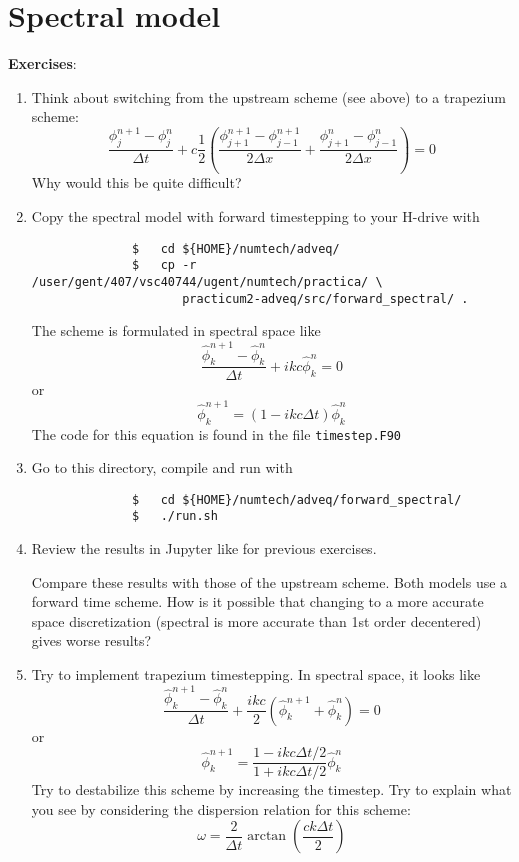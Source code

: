 \documentclass[a4paper]{article}
\begin{document}
\section{Spectral model}
%
\textbf{Exercises}:
%
\begin{enumerate}
	\item Think about switching from the upstream scheme (see above) to a trapezium scheme:
		\begin{equation*}
			\frac{\phi^{n+1}_{j}-\phi^{n}_{j}}{\Delta t}+c\frac{1}{2}\left(\frac{\phi^{n+1}_{j+1}-\phi^{n+1}_{j-1}}{2\Delta x}+\frac{\phi^{n}_{j+1}-\phi^{n}_{j-1}}{2\Delta x}\right)=0
		\end{equation*}
		Why would this be quite difficult?
	\item Copy the spectral model with forward timestepping to your H-drive with
		\begin{verbatim}
			  $   cd ${HOME}/numtech/adveq/ 
			  $   cp -r /user/gent/407/vsc40744/ugent/numtech/practica/ \
			         practicum2-adveq/src/forward_spectral/ .
		\end{verbatim}
		The scheme is formulated in spectral space like
		\begin{equation*}
			\frac{\hat\phi_k^{n+1}-\hat\phi_k^{n}}{\Delta t}+ikc\hat\phi_k^n=0
		\end{equation*}
		or
		\begin{equation*}
			\hat\phi_k^{n+1}=(1-ikc\Delta t)\hat\phi_k^n
		\end{equation*}
		The code for this equation is found in the file \verb+timestep.F90+
	\item Go to this directory, compile and run with
		\begin{verbatim}
			  $   cd ${HOME}/numtech/adveq/forward_spectral/
			  $   ./run.sh
		\end{verbatim}
	\item Review the results in Jupyter like for previous exercises.
		\par
Compare these results with those of the upstream scheme. Both models use a forward time scheme. How is it possible that changing to a more accurate space discretization (spectral is more accurate than 1st order decentered) gives worse results?
	\item Try to implement trapezium timestepping. In spectral space, it looks like
		\begin{equation*}
			\frac{\hat\phi^{n+1}_{k}-\hat\phi^{n}_{k}}{\Delta t}+\frac{ikc}{2}\left(\hat\phi^{n+1}_{k}+\hat\phi^{n}_{k}\right)=0
		\end{equation*}
		or
		\begin{equation*}
			\hat\phi^{n+1}_{k}=\frac{1-ikc\Delta t/2}{1+ikc\Delta t/2}\hat\phi_k^n
		\end{equation*}
		Try to destabilize this scheme by increasing the timestep. Try to explain what you see by considering the dispersion relation for this scheme:
		\begin{equation*}
			\omega=\frac{2}{\Delta t}\arctan\left(\frac{ck\Delta t}{2}\right)
		\end{equation*}
\end{enumerate}
%
\end{document}
